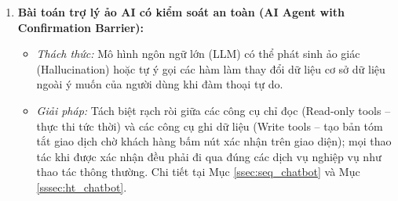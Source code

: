 \begin{enumerate}
    \item \textbf{Bài toán trợ lý ảo AI có kiểm soát an toàn (AI Agent with Confirmation Barrier):}
    \begin{itemize}
        \item \textit{Thách thức:} Mô hình ngôn ngữ lớn (LLM) có thể phát sinh ảo giác (Hallucination) hoặc tự ý gọi các hàm làm thay đổi dữ liệu cơ sở dữ liệu ngoài ý muốn của người dùng khi đàm thoại tự do.
        \item \textit{Giải pháp:} Tách biệt rạch ròi giữa các công cụ chỉ đọc (Read-only tools -- thực thi tức thời) và các công cụ ghi dữ liệu (Write tools -- tạo bản tóm tắt giao dịch chờ khách hàng bấm nút xác nhận trên giao diện); mọi thao tác khi được xác nhận đều phải đi qua đúng các dịch vụ nghiệp vụ như thao tác thông thường. Chi tiết tại Mục \ref{ssec:seq_chatbot} và Mục \ref{sssec:ht_chatbot}.
    \end{itemize}
\end{enumerate}
